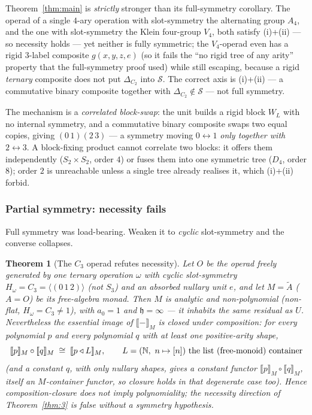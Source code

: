\documentclass[11pt]{amsart}
\theoremstyle{plain}
\newtheorem{theorem}{Theorem}[section]
\theoremstyle{definition}
\newcommand{\extM}[1]{\llbracket #1 \rrbracket_{M}}
\begin{document}
Theorem~\ref{thm:main} is \emph{strictly} stronger than its full-symmetry corollary. The operad of a
single $4$-ary operation with slot-symmetry the alternating group $A_4$, and the one with slot-symmetry
the Klein four-group $V_4$, both satisfy (i)+(ii) --- so necessity holds --- yet neither is fully
symmetric; the $V_4$-operad even has a rigid $3$-label composite $g(x,y,z,e)$ (so it fails the ``no rigid
tree of any arity'' property that the full-symmetry proof used) while still escaping, because a rigid
\emph{ternary} composite does not put $\Delta_{C_2}$ into $\mathcal S$. The correct axis is (i)+(ii) ---
a commutative binary composite together with $\Delta_{C_2}\notin\mathcal S$ --- not full symmetry.

The mechanism is a \emph{correlated block-swap}: the unit builds a rigid block $W_L$ with no internal
symmetry, and a commutative binary composite swaps two equal copies, giving $(0\,1)(2\,3)$ --- a symmetry
moving $0\leftrightarrow1$ \emph{only together with} $2\leftrightarrow3$. A block-fixing product cannot
correlate two blocks: it offers them independently ($S_2\times S_2$, order $4$) or fuses them into one
symmetric tree ($D_4$, order $8$); order $2$ is unreachable unless a single tree already realises it,
which (i)+(ii) forbid.

\subsubsection*{Partial symmetry: necessity fails}
Full symmetry was load-bearing. Weaken it to \emph{cyclic} slot-symmetry and the converse collapses.

\begin{theorem}[The $C_3$ operad refutes necessity]\label{thm:C3}
Let $O$ be the operad freely generated by one ternary operation $\omega$ with cyclic slot-symmetry
$H_\omega=C_3=\langle(0\,1\,2)\rangle$ \textup{(}not $S_3$\textup{)} and an absorbed nullary unit $e$, and
let $M=\tilde A$ \textup{(}$A=O$\textup{)} be its free-algebra monad. Then $M$ is analytic and
non-polynomial \textup{(}non-flat, $H_\omega=C_3\ne1$\textup{)}, with $a_0=1$ and $\mathfrak h=\infty$ ---
it inhabits the same residual as $U$. Nevertheless the essential image of $\extM{-}$ \emph{is} closed under
composition: for every polynomial $p$ and every polynomial $q$ with at least one positive-arity shape,
\[
  \extM{p}\circ\extM{q}\;\cong\;\extM{p\triangleleft L},\qquad
  L=(\mathbb N,\ n\mapsto[n])\ \text{the list \textup{(}free-monoid\textup{)} container}
\]
\textup{(}and a constant $q$, with only nullary shapes, gives a constant functor
$\extM{p}\circ\extM{q}$, itself an $M$-container functor, so closure holds in that degenerate case too\textup{)}.
Hence composition-closure does \emph{not} imply polynomiality; the necessity direction of
Theorem~\ref{thm:3} is false without a symmetry hypothesis.
\end{theorem}
\end{document}
